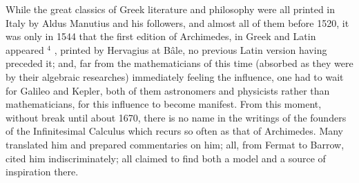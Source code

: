 While the great classics of Greek literature and philosophy were all printed in Italy by Aldus Manutius and his followers, and almost all of them before 1520, it was only in 1544 that the first edition of Archimedes, in Greek and Latin appeared \(^{4}\) , printed by Hervagius at Bâle, no previous Latin version having preceded it; and, far from the mathematicians of this time (absorbed as they were by their algebraic researches) immediately feeling the influence, one had to wait for Galileo and Kepler, both of them astronomers and physicists rather than mathematicians, for this influence to become manifest. From this moment, without break until about 1670, there is no name in the writings of the founders of the Infinitesimal Calculus which recurs so often as that of Archimedes. Many translated him and prepared commentaries on him; all, from Fermat to Barrow, cited him indiscriminately; all claimed to find both a model and a source of inspiration there.

